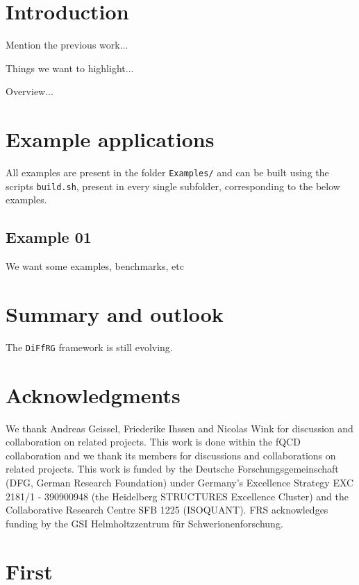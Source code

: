 \documentclass[preprint,10pt,sort&compress]{elsarticle}
\newcommand{\DiFfRG}{\texttt{DiFfRG}\xspace}
\begin{document}
\clearpage
\tableofcontents


\section{Introduction}
\label{sec:introduction}

Mention the previous work...

Things we want to highlight...

Overview...


\section{Example applications}
\label{sec:examples}
%
\noindent
%
All examples are  present in the folder \texttt{Examples/} and can be built using the scripts \texttt{build.sh}, present in every single subfolder, corresponding to the below examples.


\subsection{Example 01}
\label{sec:example01}

We want some examples, benchmarks, etc


\section{Summary and outlook}
\label{sec:outlook}

The \DiFfRG framework is still evolving.


\section*{Acknowledgments}

We thank Andreas Geissel, Friederike Ihssen and Nicolas Wink for discussion and collaboration on related projects.
This work is done within the fQCD collaboration \cite{fQCD} and we thank its members for discussions and collaborations  on related projects.
This work is funded by the Deutsche Forschungsgemeinschaft (DFG, German Research Foundation) under Germany’s Excellence Strategy EXC 2181/1 - 390900948 (the Heidelberg STRUCTURES Excellence Cluster) and the Collaborative Research Centre SFB 1225 (ISOQUANT).
FRS acknowledges funding by the GSI Helmholtzzentrum f\"ur Schwerionenforschung.




\appendix
\gdef\thesection{\Alph{section}}
\makeatletter
\renewcommand\@seccntformat[1]{\appendixname\ \csname the#1\endcsname.\hspace{0.5em}}
\makeatother
\begingroup
\allowdisplaybreaks

\section{First}

\endgroup



\end{document}
